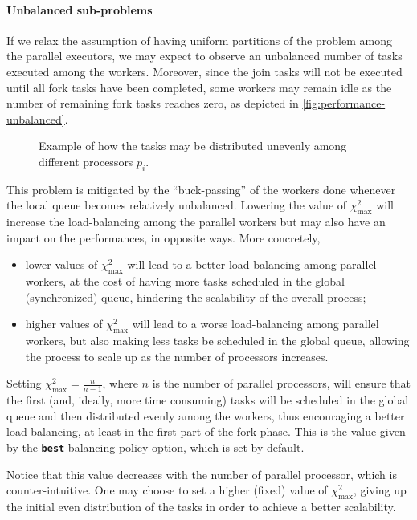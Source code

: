 \documentclass[11pt, a4paper]{article}
\begin{document}
\paragraph{Unbalanced sub-problems} If we relax the assumption of having uniform partitions of the problem among the parallel executors, we may expect to observe an unbalanced number of tasks executed among the workers. Moreover, since the join tasks will not be executed until all fork tasks have been completed, some workers may remain idle as the number of remaining fork tasks reaches zero, as depicted in \autoref{fig:performance-unbalanced}. 
%
\begin{figure}[t]
	\centering	
	
	\caption{Example of how the tasks may be distributed unevenly among different processors $p_i$.}
	\label{fig:performance-unbalanced}
\end{figure}

This problem is mitigated by the ``buck-passing'' of the workers done whenever the local queue becomes relatively unbalanced. Lowering the value of $\chi^2_\text{max}$ will increase the load-balancing among the parallel workers but may also have an impact on the performances, in opposite ways. More concretely,
%
\begin{itemize}
	\item lower values of $\chi^2_\text{max}$ will lead to a better load-balancing among parallel workers, at the cost of having more tasks scheduled in the global (synchronized) queue, hindering the scalability of the overall process;
	\item higher values of $\chi^2_\text{max}$ will lead to a worse load-balancing among parallel workers, but also making less tasks be scheduled in the global queue, allowing the process to scale up as the number of processors increases.
\end{itemize}
%
Setting $\chi^2_\text{max} = \frac{n}{n-1}$, where $n$ is the number of parallel processors, will ensure that the first (and, ideally, more time consuming) tasks will be scheduled in the global queue and then distributed evenly among the workers, thus encouraging a better load-balancing, at least in the first part of the fork phase. This is the value given by the {\tt\bfseries best} balancing policy option, which is set by default.

Notice that this value decreases with the number of parallel processor, which is counter-intuitive. One may choose to set a higher (fixed) value of $\chi^2_\text{max}$, giving up the initial even distribution of the tasks in order to achieve a better scalability.
\end{document}

